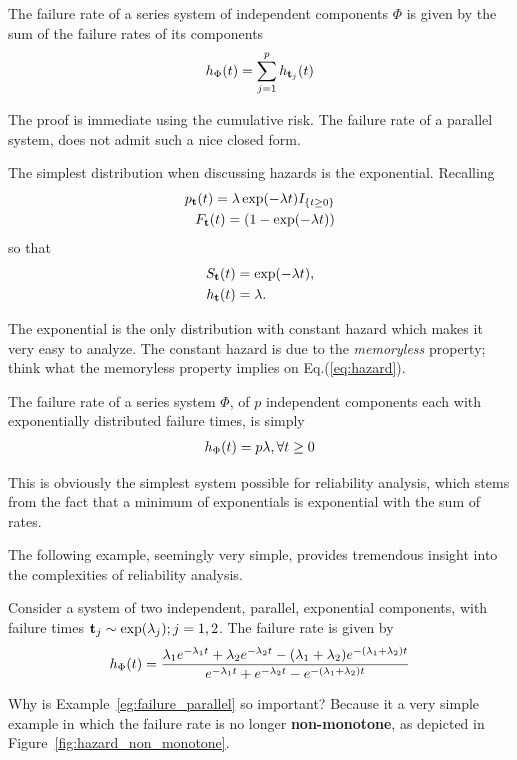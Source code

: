 \begin{theorem}
The failure rate of a series system of independent components $\Phi$ is given by the sum of the failure rates of its components
\begin{align}
	h_{\Phi} (t)= \sum_{j=1}^{p} h_{\mathbf{t}_j} (t)
\end{align}
\end{theorem}
The proof is immediate using the cumulative risk.
The failure rate of a parallel system, does not admit such a nice closed form.




\begin{example}
The simplest distribution when discussing hazards is the exponential.
Recalling
\begin{align}
	p_{\mathbf{t}} (t)= \lambda \exp(-\lambda t) I_{\{ t \geq 0 \}} \\
	F_{\mathbf{t}} (t)= (1-\exp(-\lambda t)) 
\end{align}
so that 
\begin{align}
	S_{\mathbf{t}} (t) &= \exp(-\lambda t), \\
	h_{\mathbf{t}} (t) &= \lambda.
\end{align}
\end{example}
The exponential is the only distribution with constant hazard which makes it very easy to analyze.
The constant hazard is due to the \emph{memoryless} property; think what the memoryless property implies on Eq.(\ref{eq:hazard}).



\begin{example}
The failure rate of a series system $\Phi$, of $p$ independent components each with exponentially distributed failure times, is simply 
\begin{align}
	h_{\Phi} (t)= p \lambda, \forall t \geq 0
\end{align}
\end{example}
This is obviously the simplest system possible for reliability analysis, which stems from the fact that a minimum of exponentials is exponential with the sum of rates.



The following example, seemingly very simple, provides tremendous insight into the complexities of reliability analysis.
\begin{example}
\label{eg:failure_parallel}
Consider a system of two independent, parallel, exponential components, with failure times $\mathbf{t}_j\sim \exp(\lambda_j); j=1,2$.
The failure rate is given by
\begin{align}
	h_{\Phi} (t)=
	\frac
	{\lambda_1 e^{-\lambda_1 t} + \lambda_2 e^{-\lambda_2 t}  - (\lambda_1+ \lambda_2) e^{-(\lambda_1+ \lambda_2) t}}
	{e^{-\lambda_1 t} + e^{-\lambda_2 t} - e^{-(\lambda_1+ \lambda_2) t}}
\end{align}
\end{example}
Why is Example~\ref{eg:failure_parallel} so important?
Because it a very simple example in which the failure rate is no longer \textbf{non-monotone}, as depicted in Figure~\ref{fig:hazard_non_monotone}. 


